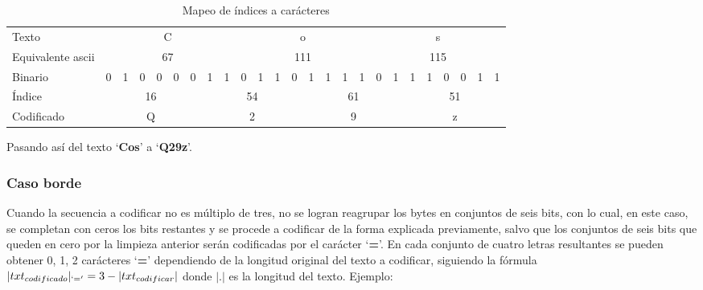 \documentclass[titlepage,a4paper]{article}
\begin{document}
\begin{table}[H]
\centering
\setlength{\tabcolsep}{4pt}
\begin{tabular}{l|cccccc||cc|cccc||cccc|cc||cccccc}
Texto             & \multicolumn{8}{c|}{C}        & \multicolumn{8}{c|}{o}        & \multicolumn{8}{c}{s}        \\
Equivalente ascii & \multicolumn{8}{c|}{67}       & \multicolumn{8}{c|}{111}      & \multicolumn{8}{c}{115}      \\
Binario           &0& 1 & 0 & 0 & 0 & 0 & 1 & 1 & 0 & 1 & 1 & 0 & 1 & 1 & 1 & 1 & 0 & 1 & 1 & 1 & 0 & 0 & 1 & 1 \\
Índice & \multicolumn{6}{c||}{16} & \multicolumn{6}{c||}{54} & \multicolumn{6}{c||}{61} & \multicolumn{6}{c}{51} \\
Codificado & \multicolumn{6}{c||}{Q} & \multicolumn{6}{c||}{2} & \multicolumn{6}{c||}{9} & \multicolumn{6}{c}{z}
\end{tabular}
\caption{Mapeo de índices a carácteres}
\label{table:paso_3}
\centering
\end{table}

Pasando así del texto `\textbf{Cos}' a `\textbf{Q29z}'.

\subsubsection{Caso borde}
Cuando la secuencia a codificar no es múltiplo de tres, no se logran reagrupar los bytes en conjuntos de seis bits, con lo cual, en este caso, se completan con ceros los bits restantes y se procede a codificar de la forma explicada previamente, salvo que los conjuntos de seis bits que queden en cero por la limpieza anterior serán codificadas por el carácter `\textbf{=}'. En cada conjunto de cuatro letras resultantes se pueden obtener {0, 1, 2} carácteres `\textbf{=}' dependiendo de la longitud original del texto a codificar, siguiendo la fórmula $|txt_{codificado}|_{`='} = 3 - |txt_{codificar}|$ donde $|.|$ es la longitud del texto. Ejemplo:
\end{document}
